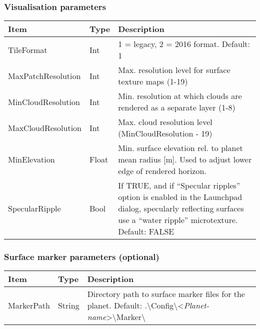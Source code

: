 \documentclass[Orbiter Developer Manual.tex]{subfiles}
\begin{document}
\subsubsection*{Visualisation parameters}
	\begin{longtable}{ |p{}|p{}|p{}| }
	\hline\rule{0pt}{2ex}
	\textbf{Item} & \textbf{Type} & \textbf{Description}\\
	\hline\rule{0pt}{2ex}
	TileFormat & Int & 1 = legacy, 2 = 2016 format. Default: 1\\
	\hline\rule{0pt}{2ex}
	MaxPatchResolution & Int & Max. resolution level for surface texture maps (1-19)\\
	\hline\rule{0pt}{2ex}
	MinCloudResolution & Int & Min. resolution at which clouds are rendered as a separate layer (1-8)\\
	\hline\rule{0pt}{2ex}
	MaxCloudResolution & Int & Max. cloud resolution level (MinCloudResolution - 19)\\
	\hline\rule{0pt}{2ex}
	MinElevation & Float & Min. surface elevation rel. to planet mean radius [m]. Used to adjust lower edge of rendered horizon.\\
	\hline\rule{0pt}{2ex}
	SpecularRipple & Bool & If TRUE, and if “Specular ripples” option is enabled in the Launchpad dialog, specularly reflecting surfaces use a “water ripple” microtexture. Default: FALSE\\
	\hline
	\end{longtable}


\subsubsection*{Surface marker parameters (optional)}
	\begin{longtable}{ |p{}|p{}|p{}| }
	\hline\rule{0pt}{2ex}
	\textbf{Item} & \textbf{Type} & \textbf{Description}\\
	\hline\rule{0pt}{2ex}
	MarkerPath & String & Directory path to surface marker files for the planet. Default: .\textbackslash Config\textbackslash <\textit{Planet-name}>\textbackslash Marker\textbackslash \\
	\hline
	\end{longtable}
\end{document}
